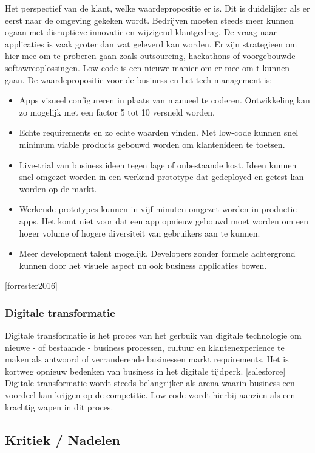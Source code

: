 Het perspectief van de klant, welke waardepropositie er is. Dit is duidelijker als er eerst naar de omgeving gekeken wordt. Bedrijven moeten steeds meer kunnen ogaan met disruptieve innovatie en wijzigend klantgedrag. De vraag naar applicaties is vaak groter dan wat geleverd kan worden. Er zijn strategieen om hier mee om te proberen gaan zoals outsourcing, hackathons of voorgebouwde softawreoplossingen. Low code is een nieuwe manier om er mee om t kunnen gaan. De waardepropositie voor de business en het tech management is:
\begin{itemize}
    \item Apps visueel configureren in plaats van manueel te coderen. Ontwikkeling kan zo mogelijk met een factor 5 tot 10 versneld worden.
    \item Echte requirements en zo echte waarden vinden. Met low-code kunnen snel minimum viable products gebouwd worden om klantenideen te toetsen.
    \item Live-trial van business ideen tegen lage of onbestaande kost. Ideen kunnen snel omgezet worden in een werkend prototype dat gedeployed en getest kan worden op de markt.
    \item Werkende prototypes kunnen in vijf minuten omgezet worden in productie apps. Het komt niet voor dat een app opnieuw gebouwd moet worden om een hoger volume of hogere diversiteit van gebruikers aan te kunnen.
    \item Meer development talent mogelijk. Developers zonder formele achtergrond kunnen door het visuele aspect nu ook business applicaties bowen.
\end{itemize} [forrester2016]

\subsubsection{Digitale transformatie}

Digitale transformatie is het proces van het gerbuik van digitale technologie om nieuwe - of bestaande - business processen, cultuur en klantenexperience te maken als antwoord of verranderende businessen markt requirements. Het is kortweg opnieuw bedenken van business in het digitale tijdperk. [salesforce]
Digitale transformatie wordt steeds belangrijker als arena waarin business een voordeel kan krijgen op de competitie. Low-code wordt hierbij aanzien als een krachtig wapen in dit proces.

\subsection{Kritiek / Nadelen}

